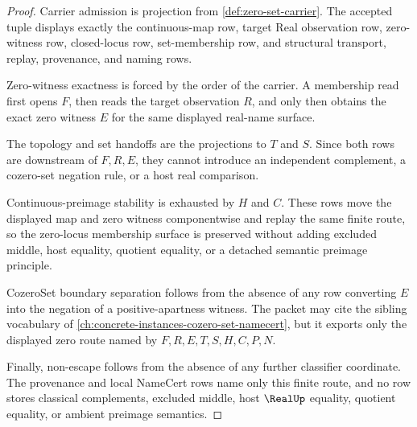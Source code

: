 \begin{proof}
Carrier admission is projection from \autoref{def:zero-set-carrier}. The accepted tuple displays exactly the continuous-map row, target Real observation row, zero-witness row, closed-locus row, set-membership row, and structural transport, replay, provenance, and naming rows.

Zero-witness exactness is forced by the order of the carrier. A membership read first opens $F$, then reads the target observation $R$, and only then obtains the exact zero witness $E$ for the same displayed real-name surface.

The topology and set handoffs are the projections to $T$ and $S$. Since both rows are downstream of $F,R,E$, they cannot introduce an independent complement, a cozero-set negation rule, or a host real comparison.

Continuous-preimage stability is exhausted by $H$ and $C$. These rows move the displayed map and zero witness componentwise and replay the same finite route, so the zero-locus membership surface is preserved without adding excluded middle, host equality, quotient equality, or a detached semantic preimage principle.

CozeroSet boundary separation follows from the absence of any row converting $E$ into the negation of a positive-apartness witness. The packet may cite the sibling vocabulary of \autoref{ch:concrete-instances-cozero-set-namecert}, but it exports only the displayed zero route named by $F,R,E,T,S,H,C,P,N$.

Finally, non-escape follows from the absence of any further classifier coordinate. The provenance and local NameCert rows name only this finite route, and no row stores classical complements, excluded middle, host $\RealUp$ equality, quotient equality, or ambient preimage semantics.
\end{proof}

